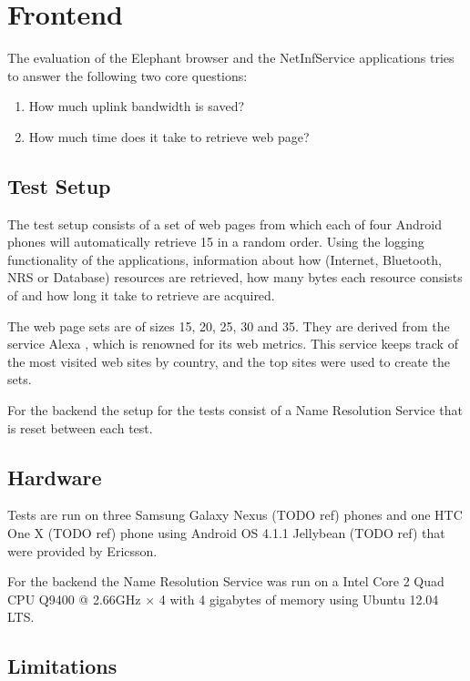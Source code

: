 \section{Frontend}

The evaluation of the Elephant browser and the NetInfService applications tries to answer the following two core questions:

\begin{enumerate}
\item How much uplink bandwidth is saved?
\item How much time does it take to retrieve web page?
\end{enumerate}

\subsection{Test Setup}

The test setup consists of a set of web pages from which each of four Android phones will automatically retrieve 15 in a random order. Using the logging functionality of the applications, information about how (Internet, Bluetooth, NRS or Database) resources are retrieved, how many bytes each resource consists of and how long it take to retrieve are acquired.

The web page sets are of sizes 15, 20, 25, 30 and 35. They are derived from the service Alexa \cite{alexa}, which is renowned for its web metrics. This service keeps track of the most visited web sites by country, and the top sites were used to create the sets.

For the backend the setup for the tests consist of a Name Resolution Service that is reset between each test.

\subsection{Hardware}

Tests are run on three Samsung Galaxy Nexus (TODO ref) phones and one HTC One X (TODO ref) phone using Android OS 4.1.1 Jellybean (TODO ref) that were provided by Ericsson.

For the backend the Name Resolution Service was run on a Intel Core 2 Quad CPU Q9400 @ 2.66GHz × 4 with 4 gigabytes of memory using Ubuntu 12.04 LTS.

\subsection{Limitations}

